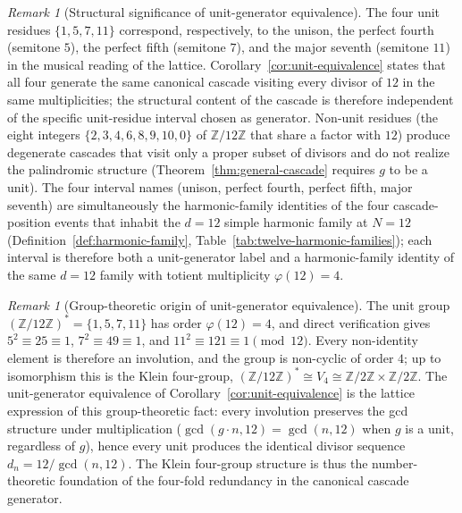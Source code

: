 \documentclass[11pt,a4paper]{article}
\theoremstyle{definition}
\theoremstyle{remark}
\newtheorem{remark}[theorem]{Remark}
\begin{document}
\begin{remark}[Structural significance of unit-generator equivalence]\label{rem:unit-equiv}
The four unit residues $\{1,5,7,11\}$ correspond, respectively, to the unison, the perfect fourth (semitone $5$), the perfect fifth (semitone $7$), and the major seventh (semitone $11$) in the musical reading of the lattice. Corollary~\ref{cor:unit-equivalence} states that all four generate the same canonical cascade visiting every divisor of $12$ in the same multiplicities; the structural content of the cascade is therefore independent of the specific unit-residue interval chosen as generator. Non-unit residues (the eight integers $\{2,3,4,6,8,9,10,0\}$ of $\mathbb{Z}/12\mathbb{Z}$ that share a factor with $12$) produce degenerate cascades that visit only a proper subset of divisors and do not realize the palindromic structure (Theorem~\ref{thm:general-cascade} requires $g$ to be a unit). The four interval names (unison, perfect fourth, perfect fifth, major seventh) are simultaneously the harmonic-family identities of the four cascade-position events that inhabit the $d=12$ simple harmonic family at $N=12$ (Definition~\ref{def:harmonic-family}, Table~\ref{tab:twelve-harmonic-families}); each interval is therefore both a unit-generator label and a harmonic-family identity of the same $d=12$ family with totient multiplicity $\varphi(12)=4$.
\end{remark}

\begin{remark}[Group-theoretic origin of unit-generator equivalence]\label{rem:klein-four}
The unit group $(\mathbb{Z}/12\mathbb{Z})^{*} = \{1,5,7,11\}$ has order $\varphi(12) = 4$, and direct verification gives $5^{2} \equiv 25 \equiv 1$, $7^{2} \equiv 49 \equiv 1$, and $11^{2} \equiv 121 \equiv 1 \pmod{12}$. Every non-identity element is therefore an involution, and the group is non-cyclic of order $4$; up to isomorphism this is the Klein four-group, $(\mathbb{Z}/12\mathbb{Z})^{*} \cong V_{4} \cong \mathbb{Z}/2\mathbb{Z} \times \mathbb{Z}/2\mathbb{Z}$. The unit-generator equivalence of Corollary~\ref{cor:unit-equivalence} is the lattice expression of this group-theoretic fact: every involution preserves the gcd structure under multiplication ($\gcd(g \cdot n, 12) = \gcd(n, 12)$ when $g$ is a unit, regardless of $g$), hence every unit produces the identical divisor sequence $d_{n} = 12/\gcd(n,12)$. The Klein four-group structure is thus the number-theoretic foundation of the four-fold redundancy in the canonical cascade generator.
\end{remark}
\end{document}
